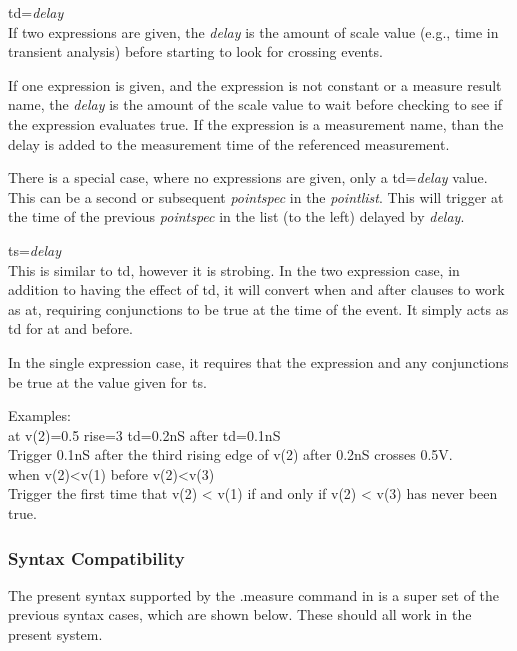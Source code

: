 \begin{description}
\item{{\vt td=}{\it delay}}\\
If two expressions are given, the {\it delay} is the amount of scale
value (e.g., time in transient analysis) before starting to look for
crossing events.

If one expression is given, and the expression is not constant or a
measure result name, the {\it delay} is the amount of the scale value
to wait before checking to see if the expression evaluates true.  If
the expression is a measurement name, than the delay is added to the
measurement time of the referenced measurement.

There is a special case, where no expressions are given, only a {\vt
td=}{\it delay} value.  This can be a second or subsequent {\it
pointspec} in the {\it pointlist}.  This will trigger at the time of
the previous {\it pointspec} in the list (to the left) delayed by {\it
delay}.

\item{{\vt ts=}{\it delay}}\\
This is similar to {\vt td}, however it is strobing.  In the two
expression case, in addition to having the effect of {\vt td}, it will
convert {\vt when} and {\vt after} clauses to work as {\vt at},
requiring conjunctions to be true at the time of the event.  It simply
acts as {\vt td} for {\vt at} and {\vt before}.

In the single expression case, it requires that the expression and
any conjunctions be true at the value given for {\vt ts}.
\end{description}

Examples:\\
{\vt at v(2)=0.5 rise=3 td=0.2nS after td=0.1nS}\\
\hspace*{1em}Trigger 0.1nS after the third rising edge of v(2) after
0.2nS crosses 0.5V.\\
{\vt when v(2)<v(1) before v(2)<v(3)}\\
\hspace*{1em}Trigger the first time that {\vt v(2) < v(1)} if and only
if {\vt v(2) < v(3)} has never been true.

\subsubsection{Syntax Compatibility}

The present syntax supported by the {\vt .measure} command in
{\WRspice} is a super set of the previous syntax cases, which
    are shown below.  These should all work in the present system.

